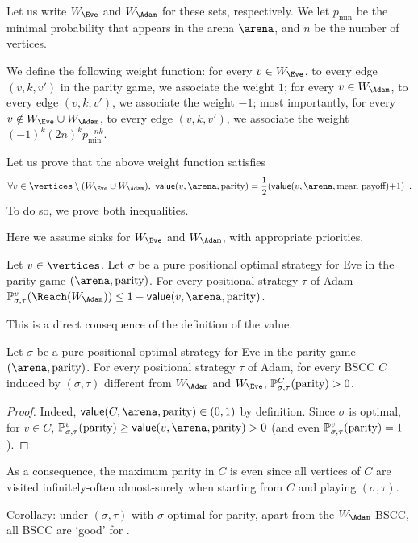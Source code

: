 Let us write $W_\Eve$ and $W_\Adam$ for these sets, respectively. We let
$p_{\min}$ be the minimal probability that appears in the arena
$\arena$, and $n$ be the number of vertices.

We define the following weight function: for every $v \in W_\Eve$,
to every edge $(v,k,v')$ in the parity game, we associate the weight
$1$; for every $v \in W_\Adam$, to every edge $(v,k,v')$, we associate
the weight $-1$; most importantly, for every
$v \notin W_\Eve \cup W_\Adam$, to every edge $(v,k,v')$, we associate the
weight $(-1)^k (2n)^k p_{\min}^{-nk}$.

Let us prove that the above weight function satisfies
\[
\forall v \in \vertices \setminus (W_\Eve \cup W_\Adam),\ 
\mathsf{value}(v,\arena,\textrm{parity}) = \frac 1 2
(\mathsf{value}(v,\arena,\textrm{mean payoff}) {+} 1)\enspace.
\]
To do so, we prove both inequalities.

Here we assume sinks for $W_\Eve$ and $W_\Adam$, with appropriate priorities.

\begin{lemma} Let $v \in \vertices$. Let $\sigma$ be a pure
positional optimal strategy for Eve in the parity game
$(\arena,\textrm{parity})$. For every positional strategy $\tau$
of Adam
$\probm_{\sigma,\tau}^v(\Reach(W_\Adam)) \leq 1 -
\mathsf{value}(v,\arena,\textrm{parity})$.
\end{lemma}
This is a direct consequence of the definition of the value.

\begin{lemma}
  Let $\sigma$ be a pure positional optimal strategy for Eve in
  the parity game $(\arena,\textrm{parity})$. For every positional
  strategy $\tau$ of Adam, for every BSCC $C$ induced by
  $(\sigma,\tau)$ different from $W_\Adam$ and $W_\Eve$,
  $\mathbb{P}_{\sigma,\tau}^C(\textrm{parity}) >0$.
\end{lemma}
\begin{proof}
  Indeed, $\mathsf{value}(C,\arena,\textrm{parity}) \in (0,1)$ by
  definition. Since $\sigma$ is optimal, for $v \in C$,
  $\probm_{\sigma,\tau}^v(\textrm{parity}) \geq
  \mathsf{value}(v,\arena,\textrm{parity}) >0$ (and even
  $\mathbb{P}_{\sigma,\tau}^v(\textrm{parity})=1$).
\end{proof}
As a consequence, the maximum parity in $C$ is even since all
vertices of $C$ are visited infinitely-often almost-surely when
starting from $C$ and playing $(\sigma,\tau)$.

Corollary: under $(\sigma,\tau)$ with $\sigma$ optimal for parity,
apart from the $W_\Adam$ BSCC, all BSCC are `good' for \Eve.

